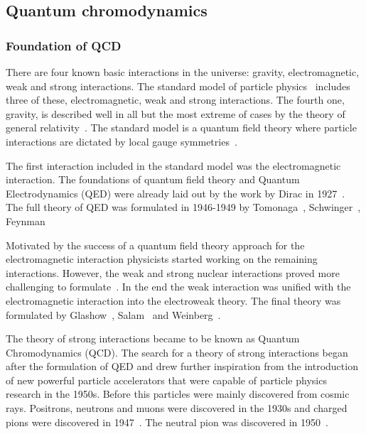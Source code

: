 \pagebreak
\subsection{Quantum chromodynamics}
\subsubsection{Foundation of QCD}
There are four known basic interactions in the universe: gravity, electromagnetic, weak and strong interactions. The standard model of particle physics~\cite{Tanabashi:2018oca} includes three of these, electromagnetic, weak and strong interactions.  The fourth one, gravity, is described well in all but the most extreme of cases by the theory of general relativity~\cite{Einstein1915}. The standard model is a quantum field theory where particle interactions are dictated by local gauge symmetries~\cite{Perkins:1982xb}. 

The first interaction included in the standard model was the electromagnetic interaction. The foundations of quantum field theory and Quantum Electrodynamics (QED) were already laid out by the work by Dirac in 1927~\cite{doi:10.1098/rspa.1927.0039}. The full theory of QED was formulated in 1946-1949 by Tomonaga~\cite{Tomonaga:1946zz},  Schwinger~\cite{Schwinger:1948yj,Schwinger:1948yk}, Feynman~\cite{Feynman:1948fi}%

Motivated by the success of a quantum field theory approach for the electromagnetic interaction physicists started working on the remaining interactions. However, the weak and strong nuclear interactions proved more challenging to formulate~\cite{Krauss:2017}. In the end the weak interaction was unified with the electromagnetic interaction into the electroweak theory. The final theory was formulated by Glashow~\cite{Glashow:1970gm}, Salam~\cite{Salam:1964ry} and Weinberg~\cite{Weinberg:1967tq}.

The theory of strong interactions became to be known as Quantum Chromodynamics (QCD). The search for a theory of strong interactions began after the formulation of QED and drew further inspiration from the introduction of new powerful particle accelerators that were capable of particle physics research in the 1950s. Before this particles were mainly discovered from cosmic rays. Positrons, neutrons and muons were discovered in the 1930s and charged pions were discovered in 1947~\cite{Occhialini:1987nr,Lattes:1947mx}. The neutral pion was discovered in 1950~\cite{Bjorklund:1950}.

